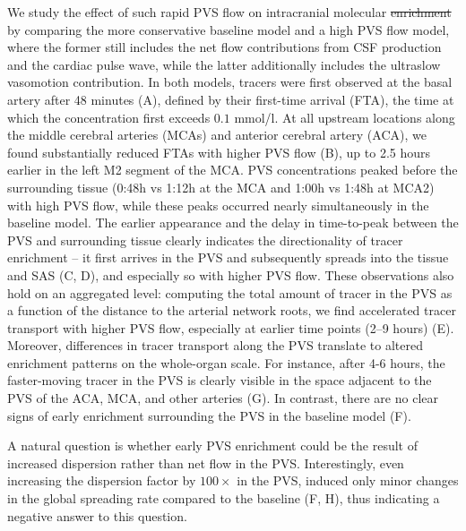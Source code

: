 \documentclass[fleqn,10pt]{wlscirep}
\providecommand{\DIFadd}[1]{{\protect\color{blue}\uwave{#1}}} %
\providecommand{\DIFdel}[1]{{\protect\color{red}\sout{#1}}}                      %
\providecommand{\DIFaddbegin}{} %
\providecommand{\DIFaddend}{} %
\providecommand{\DIFdelbegin}{} %
\providecommand{\DIFdelend}{} %
\begin{document}
We study the effect of such rapid PVS flow on intracranial molecular
\DIFdelbegin \DIFdel{enrichment }\DIFdelend \DIFaddbegin \DIFadd{transport }\DIFaddend by comparing the more conservative baseline model and a
high PVS flow model, where the former still includes the net flow
contributions from CSF production and the cardiac pulse wave, while
the latter additionally includes the ultraslow vasomotion
contribution. In both models, tracers were first observed at the basal
artery after 48 minutes (A), defined by their first-time arrival (FTA), the time at which the concentration first exceeds $0.1$ mmol/l. At all upstream locations along the middle cerebral arteries
(MCAs) and anterior cerebral artery (ACA), we found substantially
reduced FTAs with higher PVS flow (B), up to 2.5 hours
earlier in the left M2 segment of the MCA. PVS concentrations peaked
before the surrounding tissue (0:48h vs 1:12h at the MCA and 1:00h vs
1:48h at MCA2) with high PVS flow, while these peaks occurred nearly
simultaneously in the baseline model. The earlier appearance and the
delay in time-to-peak between the PVS and surrounding tissue clearly
indicates the directionality of tracer enrichment -- it first arrives
in the PVS and subsequently spreads into the tissue and SAS
(C, D), and especially so with higher PVS flow. These
observations also hold on an aggregated level: computing the total
amount of tracer in the PVS as a function of the distance to the
arterial network roots, we find accelerated tracer transport with
higher PVS flow, especially at earlier time points (2--9 hours)
(E). Moreover, differences in tracer transport along the
PVS translate to altered enrichment patterns on the whole-organ
scale. For instance, after 4-6 hours, the faster-moving tracer in the
PVS is clearly visible in the space adjacent to the PVS of the ACA, MCA, and other arteries (G). In contrast,
there are no clear signs of early enrichment surrounding the PVS in
the baseline model (F).

A natural question is whether early PVS enrichment could be the result
of increased dispersion rather than net flow in the
PVS\cite{asgari2016glymphatic,sharp2019dispersion,bojarskaite2023sleep,asgari2016glymphatic,troyetsky2021dispersion}. Interestingly,
even increasing the dispersion factor by $100 \times$ in the PVS,
induced only minor changes in the global spreading rate compared to the
baseline (F, H), thus indicating a negative answer to
this question.
\end{document}
